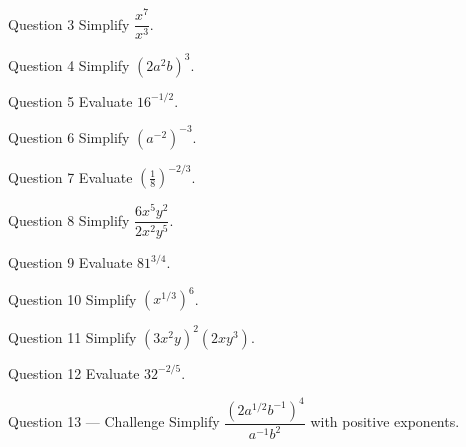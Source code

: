 \documentclass[11pt]{article}
\begin{document}
\begin{qbox}{Question 3}
Simplify $\dfrac{x^7}{x^3}$.\workspace{2.4cm}
\end{qbox}

\begin{qbox}{Question 4}
Simplify $(2a^2b)^3$.\workspace{2.4cm}
\end{qbox}

\begin{qbox}{Question 5}
Evaluate $16^{-1/2}$.\workspace{2.4cm}
\end{qbox}

\begin{qbox}{Question 6}
Simplify $(a^{-2})^{-3}$.\workspace{2.4cm}
\end{qbox}

\begin{qbox}{Question 7}
Evaluate $\left(\tfrac18\right)^{-2/3}$.\workspace{2.4cm}
\end{qbox}

\begin{qbox}{Question 8}
Simplify $\dfrac{6x^5y^2}{2x^2y^5}$.\workspace{2.4cm}
\end{qbox}

\begin{qbox}{Question 9}
Evaluate $81^{3/4}$.\workspace{2.4cm}
\end{qbox}

\begin{qbox}{Question 10}
Simplify $(x^{1/3})^6$.\workspace{2.4cm}
\end{qbox}

\begin{qbox}{Question 11}
Simplify $(3x^2y)^2(2xy^3)$.\workspace{2.4cm}
\end{qbox}

\begin{qbox}{Question 12}
Evaluate $32^{-2/5}$.\workspace{2.4cm}
\end{qbox}

\begin{qbox}{Question 13 --- Challenge}
Simplify $\dfrac{(2a^{1/2}b^{-1})^4}{a^{-1}b^{2}}$ with positive exponents.\workspace{3cm}
\end{qbox}

\clearpage
{}
\end{document}
